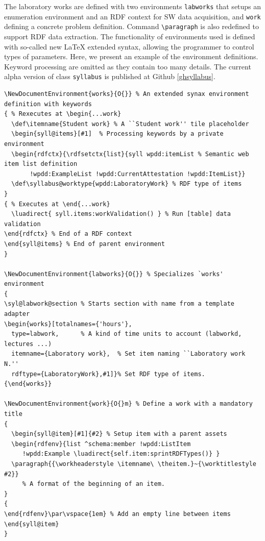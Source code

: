 \documentclass[
]{ceurart}
\begin{document}
The laboratory works are defined with two environments \verb|labworks| that setups an enumeration environment and an RDF context for SW data acquisition, and \verb|work| defining a concrete problem definition.  Command \verb|\paragraph| is also redefined to support RDF data extraction.  The functionality of environments used is defined with so-called new \LaTeX{} extended syntax, allowing the programmer to control types of parameters. Here, we present an example of the environment definitions. Keyword processing are omitted as they contain too many details.  The current alpha version of class \verb|syllabus| is published at Github \ref{ghsyllabus}.

\begin{verbatim}
\NewDocumentEnvironment{works}{O{}} % An extended synax environment definition with keywords
{ % Rexecutes at \begin{...work}
  \def\itemname{Student work} % A ``Student work'' tile placeholder
  \begin{syll@items}[#1]  % Processing keywords by a private environment
  \begin{rdfctx}{\rdfsetctx{list}{syll wpdd:itemList % Semantic web item list definition
       !wpdd:ExampleList !wpdd:CurrentAttestation !wpdd:ItemList}}
  \def\syllabus@worktype{wpdd:LaboratoryWork} % RDF type of items
}
{ % Executes at \end{...work}
  \luadirect{ syll.items:workValidation() } % Run [table] data validation
\end{rdfctx} % End of a RDF context
\end{syll@items} % End of parent environment
}

\NewDocumentEnvironment{labworks}{O{}} % Specializes `works' environment
{
\syl@labwork@section % Starts section with name from a template adapter
\begin{works}[totalnames={'hours'},
  type=labwork,      % A kind of time units to account (labworkd, lectures ...)
  itemname={Laboratory work},  % Set item naming ``Laboratory work N.''
  rdftype={LaboratoryWork},#1]}% Set RDF type of items.
{\end{works}}

\NewDocumentEnvironment{work}{O{}m} % Define a work with a mandatory title
{
  \begin{syll@item}[#1]{#2} % Setup item with a parent assets
  \begin{rdfenv}{list ^schema:member !wpdd:ListItem
     !wpdd:Example \luadirect{self.item:sprintRDFTypes()} }
  \paragraph{{\workheaderstyle \itemname\ \theitem.}~{\worktitlestyle #2}}
     % A format of the beginning of an item.
}
{
\end{rdfenv}\par\vspace{1em} % Add an empty line between items
\end{syll@item}
}
\end{verbatim}
\end{document}
